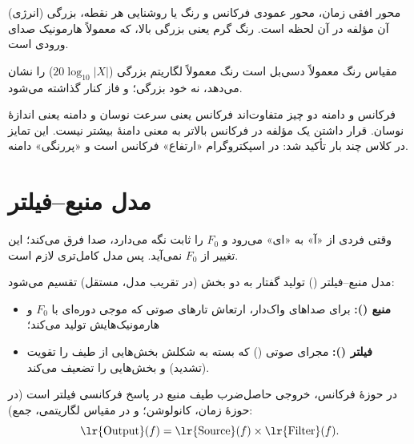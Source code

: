 محور افقی زمان، محور عمودی فرکانس و رنگ یا روشنایی هر نقطه، بزرگی (انرژی) آن مؤلفه در آن لحظه است. رنگ گرم یعنی بزرگی بالا، که معمولاً هارمونیک صدای ورودی است.


\begin{correctionbox}{مقیاس رنگ معمولاً دسی‌بل است}
رنگ معمولاً لگاریتم بزرگی ($20\log_{10}|X|$) را نشان می‌دهد، نه خود بزرگی؛ و فاز کنار گذاشته می‌شود.
\end{correctionbox}

\begin{warningbox}{فرکانس و دامنه دو چیز متفاوت‌اند}
فرکانس یعنی سرعت نوسان و دامنه یعنی اندازهٔ نوسان. قرار داشتن یک مؤلفه در فرکانس بالاتر به معنی دامنهٔ بیشتر نیست. این تمایز در کلاس چند بار تأکید شد: در اسپکتروگرام «ارتفاع» فرکانس است و «پررنگی» دامنه.
\end{warningbox}

\section{مدل منبع--فیلتر}

وقتی فردی از «آ» به «ای» می‌رود و $F_0$ را ثابت نگه می‌دارد، صدا فرق می‌کند؛ این تغییر از $F_0$ نمی‌آید. پس مدل کامل‌تری لازم است.

\begin{definitionbox}{مدل منبع--فیلتر ()}
تولید گفتار به دو بخش (در تقریب مدل، مستقل) تقسیم می‌شود:
\begin{itemize}
  \item \textbf{منبع ():} برای صداهای واک‌دار، ارتعاش تارهای صوتی که موجی دوره‌ای با $F_0$ و هارمونیک‌هایش تولید می‌کند؛
  \item \textbf{فیلتر ():} مجرای صوتی () که بسته به شکلش بخش‌هایی از طیف را تقویت (تشدید) و بخش‌هایی را تضعیف می‌کند.
\end{itemize}
\end{definitionbox}

در حوزهٔ فرکانس، خروجی حاصل‌ضرب طیف منبع در پاسخ فرکانسی فیلتر است (در حوزهٔ زمان، کانولوشن؛ و در مقیاس لگاریتمی، جمع):
\[
\text{\lr{Output}}(f)=\text{\lr{Source}}(f)\times\text{\lr{Filter}}(f).
\]

